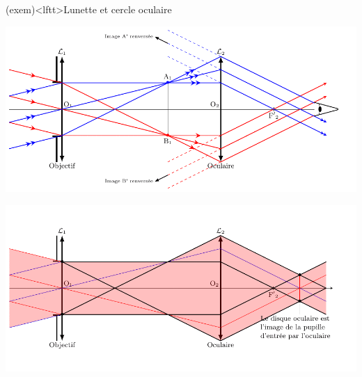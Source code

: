 \documentclass[../../main/main.tex]{subfiles}
\begin{document}
\begin{tcb*}[label=exem:co, breakable](exem)<lftt>{Lunette et cercle oculaire}
	\begin{center}
		\includegraphics[width=.78\linewidth]{kepler_2obj}
		\vspace*{-15pt}
	\end{center}
	\tcblower
	\begin{center}
		\includegraphics[width=.78\linewidth]{kepler_co}
		\vspace*{-15pt}
	\end{center}
\end{tcb*}

\newpage
\end{document}
